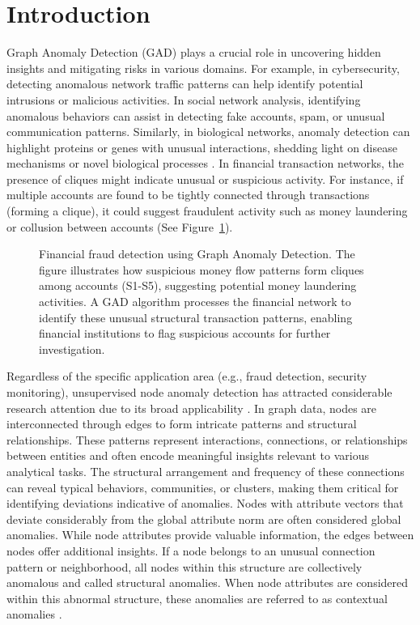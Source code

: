 \documentclass[preprint,12pt]{elsarticle}
\theoremstyle{plain}
\theoremstyle{definition}
\theoremstyle{remark}
\begin{document}
\section{Introduction}\label{sec:intro}
Graph Anomaly Detection (GAD) plays a crucial role in uncovering hidden insights and mitigating risks in various domains. For example, in cybersecurity, detecting anomalous network traffic patterns can help identify potential intrusions or malicious activities. In social network analysis, identifying anomalous behaviors can assist in detecting fake accounts, spam, or unusual communication patterns. Similarly, in biological networks, anomaly detection can highlight proteins or genes with unusual interactions, shedding light on disease mechanisms or novel biological processes \cite{akoglu2015graph, Ma_2023,Ruff_2021}. In financial transaction networks, the presence of cliques might indicate unusual or suspicious activity. For instance, if multiple accounts are found to be tightly connected through transactions (forming a clique), it could suggest fraudulent activity such as money laundering or collusion between accounts (See Figure~\ref{fig:gad_concept}).
\begin{figure}[htbp]
   \centering
   \resizebox{\linewidth}{!}{}
   \caption{Financial fraud detection using Graph Anomaly Detection. The figure illustrates how suspicious money flow patterns form cliques among accounts (S1-S5), suggesting potential money laundering activities. A GAD algorithm processes the financial network to identify these unusual structural transaction patterns, enabling financial institutions to flag suspicious accounts for further investigation.}
   \label{fig:gad_concept}
\end{figure}

Regardless of the specific application area (e.g., fraud detection, security monitoring), unsupervised node anomaly detection has attracted considerable research attention due to its broad applicability \cite{NEURIPS2022-acc1ec4a,Ma_2023}. In graph data, nodes are interconnected through edges to form intricate patterns and structural relationships. These patterns represent interactions, connections, or relationships between entities and often encode meaningful insights relevant to various analytical tasks. The structural arrangement and frequency of these connections can reveal typical behaviors, communities, or clusters, making them critical for identifying deviations indicative of anomalies. Nodes with attribute vectors that deviate considerably from the global attribute norm are often considered global anomalies. While node attributes provide valuable information, the edges between nodes offer additional insights. If a node belongs to an unusual connection pattern or neighborhood, all nodes within this structure are collectively anomalous and called structural anomalies. When node attributes are considered within this abnormal structure, these anomalies are referred to as contextual anomalies \cite{NEURIPS2022-acc1ec4a,Ma_2023}.
\end{document}
